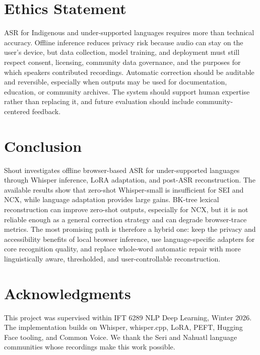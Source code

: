 \documentclass[11pt]{article}
\begin{document}
\section{Ethics Statement}

ASR for Indigenous and under-supported languages requires more than technical accuracy. Offline inference reduces privacy risk because audio can stay on the user's device, but data collection, model training, and deployment must still respect consent, licensing, community data governance, and the purposes for which speakers contributed recordings. Automatic correction should be auditable and reversible, especially when outputs may be used for documentation, education, or community archives. The system should support human expertise rather than replacing it, and future evaluation should include community-centered feedback.

\section{Conclusion}

Shout investigates offline browser-based ASR for under-supported languages through Whisper inference, LoRA adaptation, and post-ASR reconstruction. The available results show that zero-shot Whisper-small is insufficient for SEI and NCX, while language adaptation provides large gains. BK-tree lexical reconstruction can improve zero-shot outputs, especially for NCX, but it is not reliable enough as a general correction strategy and can degrade browser-trace metrics. The most promising path is therefore a hybrid one: keep the privacy and accessibility benefits of local browser inference, use language-specific adapters for core recognition quality, and replace whole-word automatic repair with more linguistically aware, thresholded, and user-controllable reconstruction.

\section*{Acknowledgments}

This project was supervised within IFT 6289 NLP Deep Learning, Winter 2026. The implementation builds on Whisper, whisper.cpp, LoRA, PEFT, Hugging Face tooling, and Common Voice. We thank the Seri and Nahuatl language communities whose recordings make this work possible.




\clearpage
\onecolumn
\appendix
\end{document}
